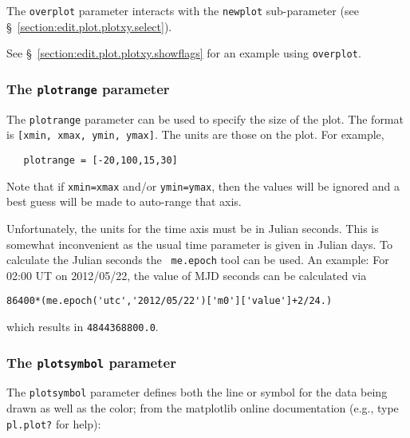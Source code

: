 The {\tt overplot} parameter interacts with the {\tt newplot}
sub-parameter (see \S~\ref{section:edit.plot.plotxy.select}).

See \S~\ref{section:edit.plot.plotxy.showflags} for an example using 
{\tt overplot}. 

\subsubsection{ The {\tt plotrange} parameter}
\label{section:edit.plot.plotxy.plotrange}

The {\tt plotrange} parameter can be used to specify the size of the
plot.  The format is {\tt [xmin, xmax, ymin, ymax]}.  The units are
those on the plot.  For example,
\small
\begin{verbatim}
   plotrange = [-20,100,15,30]
\end{verbatim}
\normalsize
Note that if {\tt xmin=xmax} and/or {\tt ymin=ymax}, then the values
will be ignored and a best guess will be made to auto-range that axis.



Unfortunately, the units for the time axis must be in Julian
seconds. This is somewhat inconvenient as the usual time parameter is
given in Julian days. To calculate the Julian seconds the {\tt
  me.epoch} tool can be used. An example:
For 02:00 UT on 2012/05/22, the value of MJD seconds can be calculated
via 

\small
\begin{verbatim}
86400*(me.epoch('utc','2012/05/22')['m0']['value']+2/24.) 
\end{verbatim}
which results in {\tt 4844368800.0}.

\subsubsection{ The {\tt plotsymbol} parameter}
\label{section:edit.plot.plotxy.symb}

The {\tt plotsymbol} parameter defines both the line or
symbol for the data being drawn as well as the color; from the
matplotlib online documentation (e.g., type {\tt pl.plot?} for help):

